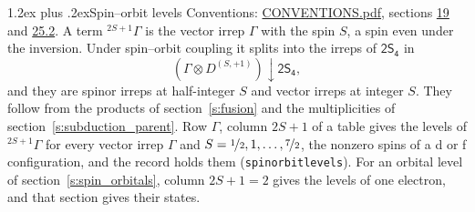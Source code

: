 \documentclass[10pt,a4paper]{article}
\makeatletter
\renewcommand\section{\@startsection{section}{1}{\z@}{-3ex plus -1ex minus -.2ex}%
  {1.2ex plus .2ex}{\normalfont\large\sffamily\bfseries\color{parttitle}}}
\numberwithin{equation}{section}
\newcommand{\grp}[1]{\mathsf{#1}}
\newcommand{\restr}[2]{#1\!\downarrow#2}
\newcommand{\irrJp}[2]{D^{(#1,#2)}}
\newcommand{\irrprod}{\otimes}
\newcommand{\term}[2]{{}^{#1}#2}
\makeatother
\begin{document}
\section{Spin--orbit levels}\label{s:spin_orbit}
Conventions: \href{../../CONVENTIONS.pdf}{CONVENTIONS.pdf}, sections \href{../../../rotation/CONVENTIONS.pdf\#conv.19}{19} and \href{../../CONVENTIONS.pdf\#conv.25.2}{25.2}.
\leavevmode\label{n:local.spin}\label{n:symbol.term}A term $\term{2S+1}{\Gamma}$ is the vector irrep $\Gamma$ with the spin $S$, a spin even under the inversion. Under spin--orbit coupling it splits into the irreps of $\grp{2S_{4}}$ in
\begin{equation}\label{e:spinorbit}\restr{(\Gamma \irrprod \irrJp{S}{+1})}{\grp{2S_{4}}},\end{equation}
and they are spinor irreps at half-integer $S$ and vector irreps at integer $S$. They follow from the products of section~\ref{s:fusion} and the multiplicities of section~\ref{s:subduction_parent}. Row $\Gamma$, column $2S + 1$ of a table gives the levels of $\term{2S+1}{\Gamma}$ for every vector irrep $\Gamma$ and $S = \nicefrac{1}{2}, 1, \dots, \nicefrac{7}{2}$, the nonzero spins of a d or f configuration, and the record holds them (\texttt{spinorbitlevels}). For an orbital level of section~\ref{s:spin_orbitals}, column $2S + 1 = 2$ gives the levels of one electron, and that section gives their states.
\end{document}

